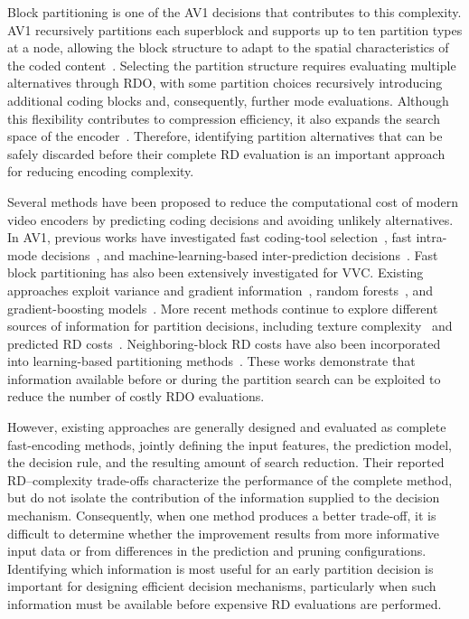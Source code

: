 \documentclass{article}
\begin{document}
Block partitioning is one of the AV1 decisions that contributes to this complexity. AV1 recursively partitions each superblock and supports up to ten partition types at a node, allowing the block structure to adapt to the spatial characteristics of the coded content~\cite{han2021av1overview,chen2018av1tools}. Selecting the partition structure requires evaluating multiple alternatives through RDO, with some partition choices recursively introducing additional coding blocks and, consequently, further mode evaluations. Although this flexibility contributes to compression efficiency, it also expands the search space of the encoder~\cite{bender2023av1complexity}. Therefore, identifying partition alternatives that can be safely discarded before their complete RD evaluation is an important approach for reducing encoding complexity.

Several methods have been proposed to reduce the computational cost of modern video encoders by predicting coding decisions and avoiding unlikely alternatives. In AV1, previous works have investigated fast coding-tool selection~\cite{xu2020fastav1intra,xu2021av1toolselection}, fast intra-mode decisions~\cite{jeong2019fastav1intra}, and machine-learning-based inter-prediction decisions~\cite{kim2019fastav1inter}. Fast block partitioning has also been extensively investigated for VVC. Existing approaches exploit variance and gradient information~\cite{chen2019fastvvcqtmt}, random forests~\cite{he2021fastvvcrandomforest}, and gradient-boosting models~\cite{saldanha2022fastvvcpartitioning}. More recent methods continue to explore different sources of information for partition decisions, including texture complexity~\cite{song2024fastvvcpartitioning} and predicted RD costs~\cite{kherchouche2024vvcrdcostregression}. Neighboring-block RD costs have also been incorporated into learning-based partitioning methods~\cite{kherchouche2025vvcrdcostapproximation}. These works demonstrate that information available before or during the partition search can be exploited to reduce the number of costly RDO evaluations.

However, existing approaches are generally designed and evaluated as complete fast-encoding methods, jointly defining the input features, the prediction model, the decision rule, and the resulting amount of search reduction. 
Their reported RD--complexity trade-offs characterize the performance of the complete method, but do not isolate the contribution of the information supplied to the decision mechanism. Consequently, when one method produces a better trade-off, it is difficult to determine whether the improvement results from more informative input data or from differences in the prediction and pruning configurations. Identifying which information is most useful for an early partition decision is important for designing efficient decision mechanisms, particularly when such information must be available before expensive RD evaluations are performed.
\end{document}
